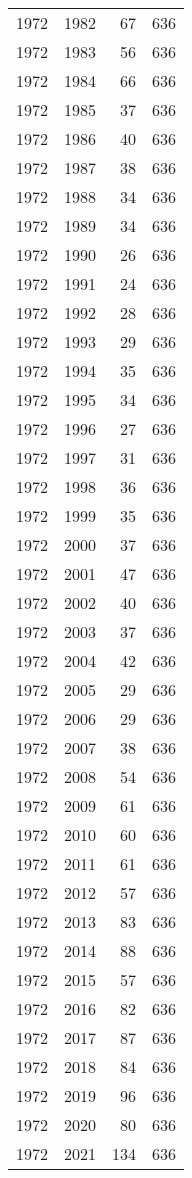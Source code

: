 \documentclass[
  10pt,
  letterpaper,
  DIV=11,
  numbers=noendperiod,
  twoside]{scrartcl}
\begin{document}
\begin{longtable}[]{@{}rrrr@{}}
1972 & 1982 & 67 & 636 \\
1972 & 1983 & 56 & 636 \\
1972 & 1984 & 66 & 636 \\
1972 & 1985 & 37 & 636 \\
1972 & 1986 & 40 & 636 \\
1972 & 1987 & 38 & 636 \\
1972 & 1988 & 34 & 636 \\
1972 & 1989 & 34 & 636 \\
1972 & 1990 & 26 & 636 \\
1972 & 1991 & 24 & 636 \\
1972 & 1992 & 28 & 636 \\
1972 & 1993 & 29 & 636 \\
1972 & 1994 & 35 & 636 \\
1972 & 1995 & 34 & 636 \\
1972 & 1996 & 27 & 636 \\
1972 & 1997 & 31 & 636 \\
1972 & 1998 & 36 & 636 \\
1972 & 1999 & 35 & 636 \\
1972 & 2000 & 37 & 636 \\
1972 & 2001 & 47 & 636 \\
1972 & 2002 & 40 & 636 \\
1972 & 2003 & 37 & 636 \\
1972 & 2004 & 42 & 636 \\
1972 & 2005 & 29 & 636 \\
1972 & 2006 & 29 & 636 \\
1972 & 2007 & 38 & 636 \\
1972 & 2008 & 54 & 636 \\
1972 & 2009 & 61 & 636 \\
1972 & 2010 & 60 & 636 \\
1972 & 2011 & 61 & 636 \\
1972 & 2012 & 57 & 636 \\
1972 & 2013 & 83 & 636 \\
1972 & 2014 & 88 & 636 \\
1972 & 2015 & 57 & 636 \\
1972 & 2016 & 82 & 636 \\
1972 & 2017 & 87 & 636 \\
1972 & 2018 & 84 & 636 \\
1972 & 2019 & 96 & 636 \\
1972 & 2020 & 80 & 636 \\
1972 & 2021 & 134 & 636 \\

\end{longtable}
\end{document}
